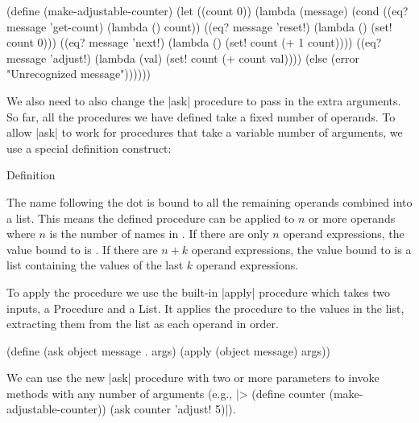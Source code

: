 \begin{schemeregion}
\begin{schemedisplay}
(define (make-adjustable-counter)
  (let ((count 0))
    (lambda (message)
      (cond ((eq? message 'get-count) (lambda () count))
            ((eq? message 'reset!) (lambda () (set! count 0)))
            ((eq? message 'next!) (lambda () (set! count (+ 1 count))))            
            ((eq? message 'adjust!) 
             (lambda (val) (set! count (+ count val))))
            (else (error "Unrecognized message"))))))
\end{schemedisplay}

We also need to also change the \scheme|ask| procedure to pass in the extra arguments.  So far, all the procedures we have defined take a fixed number of operands.  To allow \scheme|ask| to work for procedures that take a variable number of arguments, we use a special definition construct:

\begin{bnfgrammarm}{Definition}
\end{bnfgrammarm}

The name following the dot is bound to all the remaining operands combined into a list.  This means the defined procedure can be applied to $n$ or more operands where $n$ is the number of names in .  If there are only $n$ operand expressions, the value bound to  is .  If there are $n+k$ operand expressions, the value bound to  is a list containing the values of the last $k$ operand expressions.

To apply the procedure we use the built-in \scheme|apply| procedure which takes two inputs, a Procedure and a List.  It applies the procedure to the values in the list, extracting them from the list as each operand in order.  
\begin{schemedisplay}
(define (ask object message . args)
  (apply (object message) args))
\end{schemedisplay}

We can use the new \scheme|ask| procedure with two or more parameters to invoke methods with any number of arguments (e.g., \scheme|> (define counter (make-adjustable-counter)) (ask counter 'adjust! 5)|).



\end{schemeregion}
